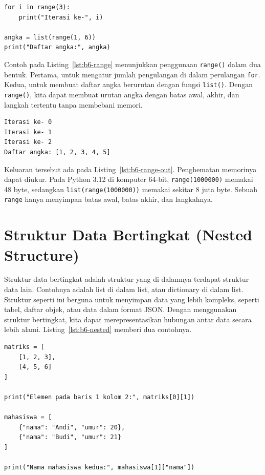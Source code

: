 \begin{lstlisting}[style=PythonStyle, caption={Dua cara memakai range}, label={lst:b6-range}]
for i in range(3):
    print("Iterasi ke-", i)

angka = list(range(1, 6))
print("Daftar angka:", angka)
\end{lstlisting}

Contoh pada Listing~\ref{lst:b6-range} menunjukkan penggunaan \texttt{range()} dalam dua bentuk. 
Pertama, untuk mengatur jumlah pengulangan di dalam perulangan \texttt{for}. 
Kedua, untuk membuat daftar angka berurutan dengan fungsi \texttt{list()}. 
Dengan \texttt{range()}, kita dapat membuat urutan angka dengan batas awal, akhir, dan langkah tertentu tanpa membebani memori.

\begin{lstlisting}[language=bash, caption={Keluaran kode range}, label={lst:b6-range-out}]
Iterasi ke- 0
Iterasi ke- 1
Iterasi ke- 2
Daftar angka: [1, 2, 3, 4, 5]
\end{lstlisting}

Keluaran tersebut ada pada Listing~\ref{lst:b6-range-out}. Penghematan memorinya dapat diukur. Pada Python 3.12 di komputer 64-bit, \texttt{range(1000000)} memakai 48 byte, sedangkan \texttt{list(range(1000000))} memakai sekitar 8 juta byte. Sebuah \texttt{range} hanya menyimpan batas awal, batas akhir, dan langkahnya.


\section{Struktur Data Bertingkat (Nested Structure)}
Struktur data bertingkat adalah struktur yang di dalamnya terdapat struktur data lain. 
Contohnya adalah list di dalam list, atau dictionary di dalam list. 
Struktur seperti ini berguna untuk menyimpan data yang lebih kompleks, seperti tabel, daftar objek, atau data dalam format JSON. 
Dengan menggunakan struktur bertingkat, kita dapat merepresentasikan hubungan antar data secara lebih alami. Listing~\ref{lst:b6-nested} memberi dua contohnya.

\begin{lstlisting}[style=PythonStyle, caption={List di dalam list dan dictionary di dalam list}, label={lst:b6-nested}]
matriks = [
    [1, 2, 3],
    [4, 5, 6]
]

print("Elemen pada baris 1 kolom 2:", matriks[0][1])

mahasiswa = [
    {"nama": "Andi", "umur": 20},
    {"nama": "Budi", "umur": 21}
]

print("Nama mahasiswa kedua:", mahasiswa[1]["nama"])
\end{lstlisting}

